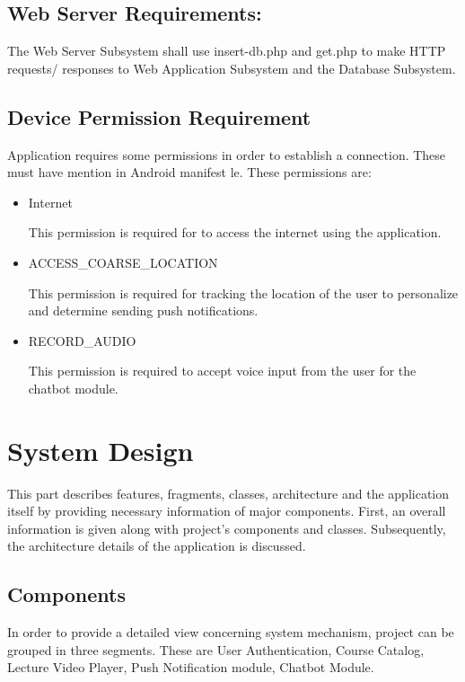 \subsection{Web Server Requirements:}
The Web Server Subsystem shall use insert-db.php and get.php to make HTTP requests/ responses to Web Application Subsystem and the Database Subsystem.

\subsection{Device Permission Requirement}
Application requires some permissions in order to establish a connection. These must have mention in Android manifest le. These permissions are:

\begin{itemize}

\item{Internet

This permission is required for to access the internet using the application.}

\item{ACCESS\_COARSE\_LOCATION

This permission is required for tracking the location of the user to personalize and determine sending push notifications.}

\item{RECORD\_AUDIO

This permission is required to accept voice input from the user for the chatbot module.}


\end{itemize}

\section{System Design}
This part describes features, fragments, classes, architecture and the application itself by providing necessary information of major components. First, an overall information is given along with project's components and classes. Subsequently, the architecture details of the application is discussed.

\subsection{Components}
In order to provide a detailed view concerning system mechanism, project can be grouped in three segments. These are User Authentication, Course Catalog, Lecture Video Player, Push Notification module, Chatbot Module.

